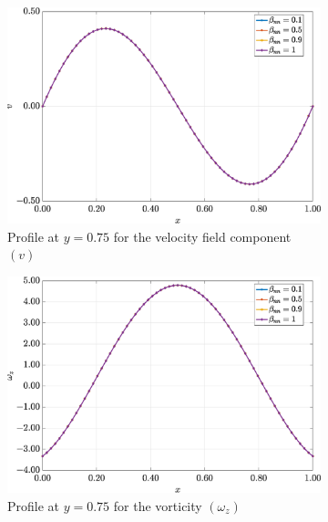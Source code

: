 \documentclass[preprint, 12pt]{elsarticle}
\begin{document}
\begin{figure}[H]
\begin{subfigure}[b]{.46\textwidth}
        \includegraphics[width=\textwidth]{Slice_y_Tog_Numerical_NormErr_2nd_Betann_1_Re_1000_Wi_1_epsilon_0_xi_0_alphaG_0_Dt_1e-06_at_0.05_tipsim_1_MMS_12_x0.75y0.75_V.eps}
        \caption{Profile at $y=0.75$ for the velocity field component $(v)$}
        \label{fig_slice_y_v_2nd_Case1_oldorydb}
    \end{subfigure}
    \begin{subfigure}[b]{.46\textwidth}
        \includegraphics[width=\textwidth]{Slice_y_Tog_Numerical_NormErr_2nd_Betann_1_Re_1000_Wi_1_epsilon_0_xi_0_alphaG_0_Dt_1e-06_at_0.05_tipsim_1_MMS_12_x0.75y0.75_Wz.eps}
        \caption{Profile at $y=0.75$ for the vorticity $(\omega_{z})$}
        \label{fig_slice_y_wz_2nd_Case1_oldorydb}
    \end{subfigure}
    \vspace{0.2cm}
    \qquad
    \begin{subfigure}[b]{.46\textwidth}

\end{subfigure}
\end{figure}
\end{document}

